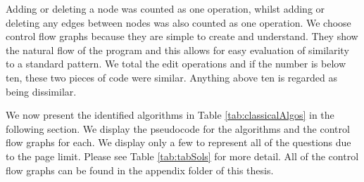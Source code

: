 \documentclass[10pt,twocolumn,hidelinks]{IEEEtran}
\begin{document}
\par Adding or deleting a node was counted as one operation, whilst adding or deleting any edges between nodes was also counted as one operation. We choose control flow graphs because they are simple to create and understand. They show the natural flow of the program and this allows for easy evaluation of similarity to a standard pattern. We total the edit operations and if the number is below ten, these two pieces of code were similar. Anything above ten is regarded as being dissimilar.
\par We now present the identified algorithms in Table \ref{tab:classicalAlgos} in the following section. We display the pseudocode for the algorithms and the control flow graphs for each. We display only a few to represent all of the questions due to the page limit. Please see Table \ref{tab:tabSols} for more detail. All of the control flow graphs can be found in the appendix folder of this thesis.
\end{document}
